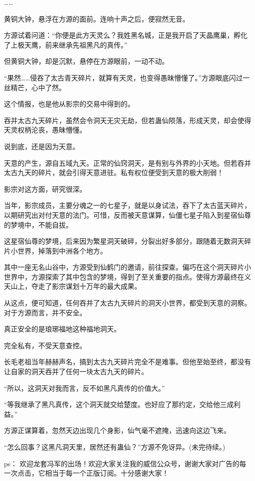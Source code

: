 \begin{this_body}
……

黄铜大钟，悬浮在方源的面前。连响十声之后，便寂然无音。

方源试着问道：“你便是此方天灵么？我姓黑名城，正是我开启了天晶鹰巢，孵化了上极天鹰，前来继承先祖黑凡的真传。”

但黄铜大钟，却是沉默，悬停在方源眼前，一动不动。

“果然……侵吞了太古青天碎片，就算有天灵，也变得愚昧懵懂了。”方源眼底闪过一丝精芒，心中了然。

这个情报，也是他从影宗的交易中得到的。

吞并太古九天碎片，虽然会令洞天无灾无劫，但若蛊仙陨落，形成天灵，却会使得天灵权柄沦丧，愚昧懵懂。

说到底，还是因为天意。

天意的产生，源自五域九天。正常的仙窍洞天，是有别与外界的小天地。但若吞并太古九天的碎片，就会引得天意进驻。私有权位便受到天意的极大削弱！

影宗对这方面，研究很深。

当年，影宗成员，主要分魂之一的七星子，就是以身试法，吞下了太古蓝天碎片，以期研究出对付天意的法门。可惜，反而被天意谋算，仙僵七星子陷入到星宿仙尊的梦境中，不能自拔。

这星宿仙尊的梦境，后来因为繁星洞天破碎，分裂出好多部分，跟随着无数洞天碎片小世界，掉落到中洲各个地方。

其中一座无名山谷中，方源受到仙鹤门的邀请，前往探查。偏巧在这个洞天碎片小世界中，方源探索了其中包含的梦境，得到了至关重要的指点。使得方源最终在义天山上，夺走了影宗谋划十万年的最大成果。

从这点，便可知道，任何吞并了太古九天碎片的洞天小世界，都受到天意的洞察。对于方源而言，并不安全。

真正安全的是琅琊福地这种福地洞天。

完全私有，不受天意查控。

长毛老祖当年赫赫声名，搞到太古九天碎片完全不是难事。但他至始至终，都没有让自家的洞天吞并了任何一块太古九天的碎片。

“所以，这洞天对我而言，反不如黑凡真传的价值大。”

“等我继承了黑凡真传，这个洞天就交给楚度。也好应了那约定，交给他三成利益。”

方源正谋算着，忽然天边出现几个身影，仙气毫不遮掩，迅速向这边飞来。

“怎么回事？这黑凡洞天里，居然还有蛊仙？”方源不免讶异。(未完待续。)

ps：    欢迎龙套冯军的出场！欢迎大家关注我的威信公众号，谢谢大家对广告的每一次点击，它相当于每一个正版订阅。十分感谢大家！

\end{this_body}

